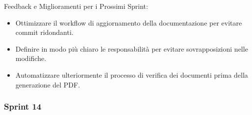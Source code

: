 \documentclass{article}
\begin{document}
                Feedback e Miglioramenti per i Prossimi Sprint:
                \begin{itemize}
                    \item Ottimizzare il workflow di aggiornamento della documentazione per evitare commit ridondanti.
                    \item Definire in modo più chiaro le responsabilità per evitare sovrapposizioni nelle modifiche.
                    \item Automatizzare ulteriormente il processo di verifica dei documenti prima della generazione del PDF.
                \end{itemize}
            \subsubsection{Sprint 14}
\end{document}
